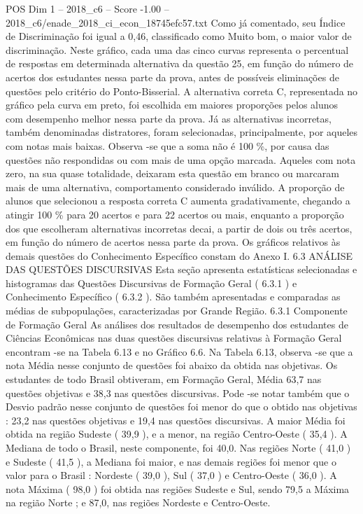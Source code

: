 \begin{textsample}{POS Dim 1 – 2018\_c6 – Score -1.00 – 2018\_c6/enade\_2018\_ci\_econ\_18745efc57.txt}
Como já comentado, seu Índice de Discriminação foi igual a 0,46, classificado como Muito bom, o maior valor de discriminação.
Neste gráfico, cada uma das cinco curvas representa o percentual de respostas em determinada alternativa da questão 25, em função do número de acertos dos estudantes nessa parte da prova, antes de possíveis eliminações de questões pelo critério do Ponto-Bisserial.
A alternativa correta C, representada no gráfico pela curva em preto, foi escolhida em maiores proporções pelos alunos com desempenho melhor nessa parte da prova.
Já as alternativas incorretas, também denominadas distratores, foram selecionadas, principalmente, por aqueles com notas mais baixas.
Observa -se que a soma não é 100 \%, por causa das questões não respondidas ou com mais de uma opção marcada.
Aqueles com nota zero, na sua quase totalidade, deixaram esta questão em branco ou marcaram mais de uma alternativa, comportamento considerado inválido.
A proporção de alunos que selecionou a resposta correta C aumenta gradativamente, chegando a atingir 100 \% para 20 acertos e para 22 acertos ou mais, enquanto a proporção dos que escolheram alternativas incorretas decai, a partir de dois ou três acertos, em função do número de acertos nessa parte da prova.
Os gráficos relativos às demais questões do Conhecimento Específico constam do Anexo I. 6.3 ANÁLISE DAS QUESTÕES DISCURSIVAS Esta seção apresenta estatísticas selecionadas e histogramas das Questões Discursivas de Formação Geral ( 6.3.1 ) e Conhecimento Específico ( 6.3.2 ).
São também apresentadas e comparadas as médias de subpopulações, caracterizadas por Grande Região. 6.3.1 Componente de Formação Geral As análises dos resultados de desempenho dos estudantes de Ciências Econômicas nas duas questões discursivas relativas à Formação Geral encontram -se na Tabela 6.13 e no Gráfico 6.6.
Na Tabela 6.13, observa -se que a nota Média nesse conjunto de questões foi abaixo da obtida nas objetivas.
Os estudantes de todo Brasil obtiveram, em Formação Geral, Média 63,7 nas questões objetivas e 38,3 nas questões discursivas.
Pode -se notar também que o Desvio padrão nesse conjunto de questões foi menor do que o obtido nas objetivas : 23,2 nas questões objetivas e 19,4 nas questões discursivas.
A maior Média foi obtida na região Sudeste ( 39,9 ), e a menor, na região Centro-Oeste ( 35,4 ).
A Mediana de todo o Brasil, neste componente, foi 40,0.
Nas regiões Norte ( 41,0 ) e Sudeste ( 41,5 ), a Mediana foi maior, e nas demais regiões foi menor que o valor para o Brasil : Nordeste ( 39,0 ), Sul ( 37,0 ) e Centro-Oeste ( 36,0 ).
A nota Máxima ( 98,0 ) foi obtida nas regiões Sudeste e Sul, sendo 79,5 a Máxima na região Norte ; e 87,0, nas regiões Nordeste e Centro-Oeste.

\end{textsample}
